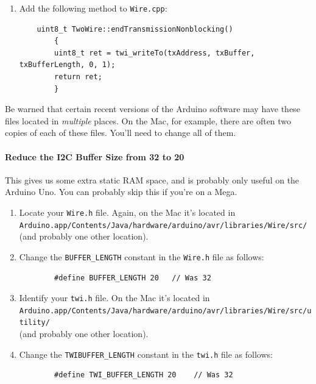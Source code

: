 \documentclass{article}
\begin{document}
\begin{enumerate}
{\begin{enumerate}
\item Add the following method to \texttt{Wire.cpp}:

\begin{verbatim}
    uint8_t TwoWire::endTransmissionNonblocking()
        {
        uint8_t ret = twi_writeTo(txAddress, txBuffer, txBufferLength, 0, 1);
        return ret;
        }
\end{verbatim}
\end{enumerate}

Be warned that certain recent versions of the Arduino software may have these files located in {\it multiple} places.  On the Mac, for example, there are often two copies of each of these files.  You'll need to change all of them.

\paragraph{Reduce the I2C Buffer Size from 32 to 20} This gives us some extra static RAM space, and is probably only useful on the Arduino Uno.  You can probably skip this if you're on a Mega.

\begin{enumerate}
\item Locate your \texttt{Wire.h} file.  Again, on the Mac it's located in\\
\texttt{Arduino.app/Contents/Java/hardware/arduino/avr/libraries/Wire/src/}\\(and probably one other location).

\item Change the \texttt{BUFFER\_LENGTH} constant in the \texttt{Wire.h} file as follows:

\begin{verbatim}
        #define BUFFER_LENGTH 20   // Was 32
\end{verbatim}

\item Identify your \texttt{twi.h} file.  On the Mac it's located in\\
\texttt{Arduino.app/Contents/Java/hardware/arduino/avr/libraries/Wire/src/utility/}\\(and probably one other location).

\item Change the \texttt{TWIBUFFER\_LENGTH} constant in the \texttt{twi.h} file as follows:

\begin{verbatim}
        #define TWI_BUFFER_LENGTH 20    // Was 32
\end{verbatim}
\end{enumerate}

}
\end{enumerate}
\end{document}
